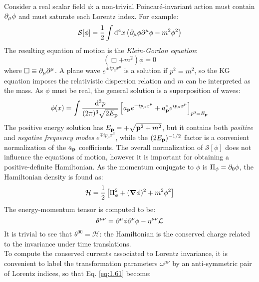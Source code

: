 Consider a real scalar field $ \phi $: a non-trivial Poincaré-invariant action must contain $ \partial_\mu \phi $ and must saturate each Lorentz index. For example:
\begin{equation}
  \mathcal{S}[\phi] = \frac{1}{2} \int \mathrm{d}^4 x \left( \partial_\mu \phi \partial^\mu \phi - m^2 \phi^2 \right)
  \label{eq:1.72}
\end{equation}
The resulting equation of motion is the \textit{Klein-Gordon equation}:
\begin{equation}
  \left( \Box + m^2 \right) \phi = 0
  \label{eq:1.73}
\end{equation}
where $ \Box \equiv \partial_\mu \partial^\mu $. A plane wave $ e^{\pm i p_\mu x^\mu} $ is a solution if $ p^2 = m^2 $, so the KG equation imposes the relativistic dispersion relation and $ m $ can be interpreted as the mass. As $ \phi $ must be real, the general solution is a superposition of waves:
\begin{equation}
  \phi(x) = \int \frac{\mathrm{d}^3 p}{(2\pi)^3 \sqrt{2E_{\mathbf{p}}}} \left[ a_{\mathbf{p}} e^{-i p_\mu x^\mu} + a^*_{\mathbf{p}} e^{i p_\mu x^\mu} \right]_{p^0 = E_{\mathbf{p}}}
  \label{eq:1.74}
\end{equation}
The positive energy solution has $ E_{\mathbf{p}} = + \sqrt{\mathbf{p}^2 + m^2} $, but it contains both \textit{positive} and \textit{negative frequency modes} $ e^{\mp i p_\mu x^\mu} $, while the $ (2E_{\mathbf{p}})^{-1/2} $ factor is a convenient normalization of the $ a_{\mathbf{p}} $ coefficients. The overall normalization of $ \mathcal{S}[\phi] $ does not influence the equations of motion, however it is important for obtaining a positive-definite Hamiltonian. As the momentum conjugate to $ \phi $ is $ \Pi_\phi = \partial_0 \phi $, the Hamiltonian density is found as:
\begin{equation}
  \mathcal{H} = \frac{1}{2} \left[ \Pi_\phi^2 + (\boldsymbol{\nabla} \phi)^2 + m^2 \phi^2 \right]
  \label{eq:1.75}
\end{equation}
The energy-momentum tensor is computed to be:
\begin{equation}
  \theta^{\mu \nu} = \partial^\mu \phi \partial^\nu \phi - \eta^{\mu \nu} \mathcal{L}
  \label{eq:1.76}
\end{equation}
It is trivial to see that $ \theta^{00} = \mathcal{H} $: the Hamiltonian is the conserved charge related to the invariance under time translations.\\
To compute the conserved currents associated to Lorentz invariance, it is convenient to label the transformation parameters $ \omega^{\mu \nu} $ by an anti-symmetric pair of Lorentz indices, so that Eq. \ref{eq:1.61} become:

